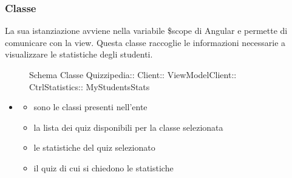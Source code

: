 \subsubsection{Classe }
La sua istanziazione avviene nella variabile \$scope di Angular e permette di comunicare con la view. Questa classe raccoglie le informazioni necessarie a visualizzare le statistiche degli studenti.
\begin{figure}[H]
\centering
\noindent{}
\caption[Schema Classe MyStudentsStats]{Schema Classe Quizzipedia:: Client:: ViewModelClient:: CtrlStatistics:: MyStudentsStats}
\end{figure}
\begin{itemize}
\item {}
\begin{itemize}
\item {}
\newline
sono le classi presenti nell'ente
\item {}
\newline
la lista dei quiz disponibili per la classe selezionata
\item {}
\newline
le statistiche del quiz selezionato
\item {}
\newline
il quiz di cui si chiedono le statistiche
\end{itemize}
\end{itemize}
